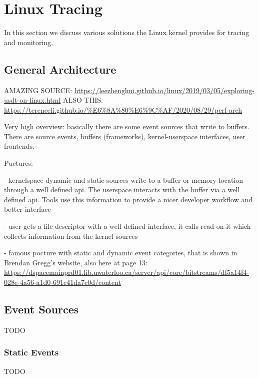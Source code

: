 \chapter{Linux Tracing}
\label{cha:linux-tracing}

In this section we discuss various solutions the Linux kernel provides for
tracing and monitoring.

\section{General Architecture}

AMAZING SOURCE:
\url{https://leezhenghui.github.io/linux/2019/03/05/exploring-usdt-on-linux.html}
ALSO THIS:
\url{https://terenceli.github.io/%E6%8A%80%E6%9C%AF/2020/08/29/perf-arch}

Very high overview: basically there are some event sources that write to
buffers.  There are source events, buffers (frameworks), kernel-userspace
interfaces, user frontends.

Puctures:

- kernelspace dynamic and static sources write to a buffer or memory location
through a well defined api. The userspace interacts with the buffer via a well
defined api. Tools use this information to provide a nicer developer workflow
and better interface

- user gets a file descriptor with a well defined interface, it calls read on it
which collects information from the kernel sources

- famous pocture with static and dynamic event categories, that is shown in
Brendan Gregg's website, also here at page 13:
\url{https://dspacemainprd01.lib.uwaterloo.ca/server/api/core/bitstreams/df5a14f4-028e-4a56-a1d0-691c41da7e0d/content}



\section{Event Sources}

TODO

\subsection{Static Events}

TODO

